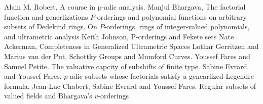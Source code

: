 \documentclass[12pt]{dalthesis}
\theoremstyle{plain}
\theoremstyle{definition}
\begin{document}
%	
\begin{thebibliography}{1}
 Alain M. Robert, A course in p-adic analysis.
 Manjul Bhargava, The factorial function and generlizations
 $P$-orderings and polynomial functions on arbitrary subsets of Dedekind rings.
 On $ P$-orderings, rings of integer-valued polynomials, and ultrametric analysis
 Keith Johnson, P-orderings and Fekete sets
 Nate Ackerman,  Completeness in Generalized Ultrametric Spaces
 Lothar Gerritzen and Marius van der Put, Schottky Groups and Mumford Curves.
 Youssef Fares and Samuel Petite. The valuative capcity of subshifts of finite type.
 Sabine Evrard and Youssef Fares. $p$-adic subsets whose factorials satisfy a genearlized Legendre formula.
 Jean-Luc Chabert, Sabine Evrard and Youssef Fares. Regular subsets of valued fields and Bhargava’s $v$-orderings
\end{thebibliography}
\end{document}
